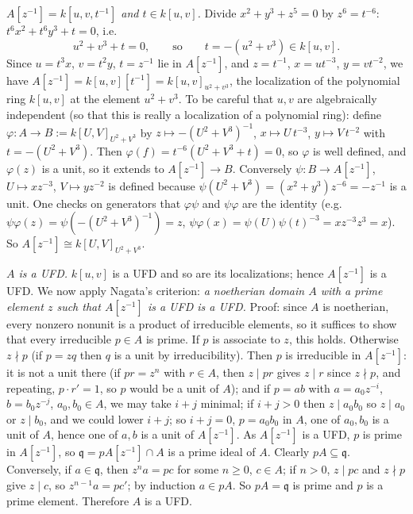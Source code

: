 \documentclass[11pt]{article}
\begin{document}
\emph{$A[z^{-1}]=k[u,v,t^{-1}]$ and $t\in k[u,v]$.} Divide $x^2+y^3+z^5=0$ by $z^6=t^{-6}$: $t^6x^2+t^6y^3+t=0$, i.e.\
\[
u^2+v^3+t=0,\qquad\text{so}\qquad t=-(u^2+v^3)\in k[u,v].
\]
Since $u=t^3x$, $v=t^2y$, $t=z^{-1}$ lie in $A[z^{-1}]$, and $z=t^{-1}$, $x=ut^{-3}$, $y=vt^{-2}$, we have $A[z^{-1}]=k[u,v][t^{-1}]=k[u,v]_{u^2+v^3}$, the localization of the polynomial ring $k[u,v]$ at the element $u^2+v^3$. To be careful that $u,v$ are algebraically independent (so that this is really a localization of a polynomial ring): define $\varphi:A\to B:=k[U,V]_{U^2+V^3}$ by $z\mapsto-(U^2+V^3)^{-1}$, $x\mapsto U\,t^{-3}$, $y\mapsto V\,t^{-2}$ with $t=-(U^2+V^3)$. Then $\varphi(f)=t^{-6}(U^2+V^3+t)=0$, so $\varphi$ is well defined, and $\varphi(z)$ is a unit, so it extends to $A[z^{-1}]\to B$. Conversely $\psi:B\to A[z^{-1}]$, $U\mapsto xz^{-3}$, $V\mapsto yz^{-2}$ is defined because $\psi(U^2+V^3)=(x^2+y^3)z^{-6}=-z^{-1}$ is a unit. One checks on generators that $\varphi\psi$ and $\psi\varphi$ are the identity (e.g.\ $\psi\varphi(z)=\psi(-(U^2+V^3)^{-1})=z$, $\psi\varphi(x)=\psi(U)\psi(t)^{-3}=xz^{-3}z^{3}=x$). So $A[z^{-1}]\cong k[U,V]_{U^2+V^3}$.

\emph{$A$ is a UFD.} $k[u,v]$ is a UFD and so are its localizations; hence $A[z^{-1}]$ is a UFD. We now apply Nagata's criterion: \emph{a noetherian domain $A$ with a prime element $z$ such that $A[z^{-1}]$ is a UFD is a UFD.} Proof: since $A$ is noetherian, every nonzero nonunit is a product of irreducible elements, so it suffices to show that every irreducible $p\in A$ is prime. If $p$ is associate to $z$, this holds. Otherwise $z\nmid p$ (if $p=zq$ then $q$ is a unit by irreducibility). Then $p$ is irreducible in $A[z^{-1}]$: it is not a unit there (if $pr=z^n$ with $r\in A$, then $z\mid pr$ gives $z\mid r$ since $z\nmid p$, and repeating, $p\cdot r'=1$, so $p$ would be a unit of $A$); and if $p=ab$ with $a=a_0z^{-i}$, $b=b_0z^{-j}$, $a_0,b_0\in A$, we may take $i+j$ minimal; if $i+j>0$ then $z\mid a_0b_0$ so $z\mid a_0$ or $z\mid b_0$, and we could lower $i+j$; so $i+j=0$, $p=a_0b_0$ in $A$, one of $a_0,b_0$ is a unit of $A$, hence one of $a,b$ is a unit of $A[z^{-1}]$. As $A[z^{-1}]$ is a UFD, $p$ is prime in $A[z^{-1}]$, so $\mathfrak q=pA[z^{-1}]\cap A$ is a prime ideal of $A$. Clearly $pA\subseteq\mathfrak q$. Conversely, if $a\in\mathfrak q$, then $z^na=pc$ for some $n\ge 0$, $c\in A$; if $n>0$, $z\mid pc$ and $z\nmid p$ give $z\mid c$, so $z^{n-1}a=pc'$; by induction $a\in pA$. So $pA=\mathfrak q$ is prime and $p$ is a prime element. Therefore $A$ is a UFD.
\end{document}
